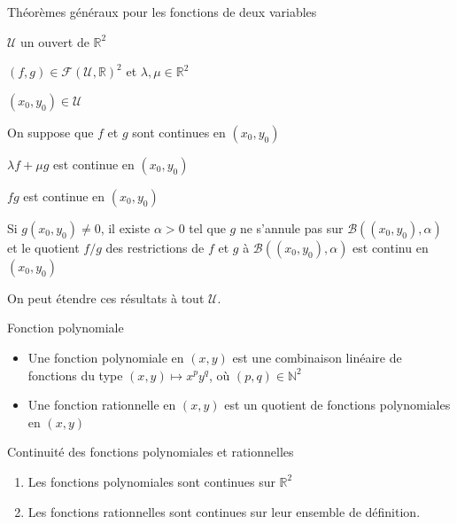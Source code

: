     \begin{prop}{Théorèmes généraux pour les fonctions de deux variables}{}
        \begin{soient}
            \item $\mathcal{U}$ un ouvert de $\mathbb{R}^2$
            \item $(f,g) \in \mathcal{F}(\mathcal{U},\mathbb{R})^2$ et $\lambda,\mu \in \mathbb{R}^2$
            \item $(x_0,y_0) \in \mathcal{U}$
        \end{soient}
        On suppose que $f$ et $g$ sont continues en $(x_0,y_0)$

        \begin{alors}
            \item $\lambda f + \mu g$ est continue en $(x_0,y_0)$
            \item $fg$ est continue en $(x_0,y_0)$
            \item Si $g(x_0,y_0) \neq 0$, il existe $\alpha >0$  tel que $g$ ne s’annule pas sur $\mathcal{B}\left((x_0,y_0), \alpha\right)$ et le quotient $ f / g$ des restrictions de $f$ et $g$ à $\mathcal{B}\left((x_0,y_0), \alpha\right)$ est continu en $(x_0,y_0)$
        \end{alors}
        On peut étendre ces résultats à tout $\mathcal{U}$.
    \end{prop}

    \begin{defi}{Fonction polynomiale}{}
        \begin{itemize}
            \item Une fonction polynomiale en $(x,y)$ est une combinaison linéaire de fonctions du type $(x,y) \longmapsto x^p y^q$, où $(p,q) \in \mathbb{N}^2$
            \item Une fonction rationnelle en $(x,y)$ est un quotient de fonctions polynomiales en $(x,y)$
        \end{itemize}
    \end{defi}

    \begin{coro}{Continuité des fonctions polynomiales et rationnelles}{}
        \begin{enumerate}
            \item Les fonctions polynomiales sont continues sur $\mathbb{R}^2$
            \item Les fonctions rationnelles sont continues sur leur ensemble de définition.
        \end{enumerate}
    \end{coro}

